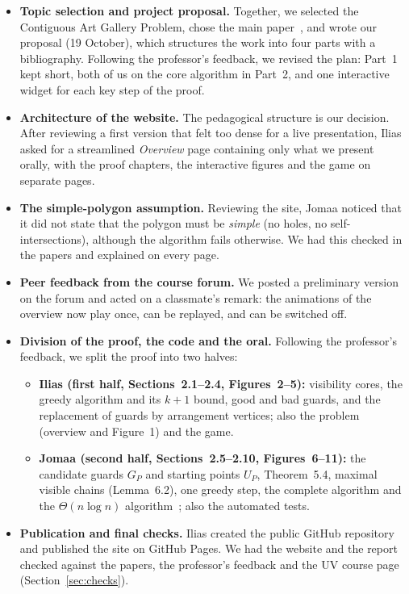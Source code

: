 \documentclass[11pt,a4paper]{article}
\begin{document}
\begin{tcolorbox}[breakable,colback=green!4,colframe=green!45!black,boxrule=0.5pt,arc=2mm,left=2.5mm,right=2.5mm,top=1.5mm,bottom=1.5mm]
\begin{itemize}[leftmargin=*]
\item \textbf{Topic selection and project proposal.} Together, we selected the Contiguous Art Gallery Problem, chose the main paper~\cite{deBerg2025}, and wrote
our proposal (19 October), which structures the work into four parts with a bibliography. Following the professor's feedback, we revised the plan: Part~1
kept short, both of us on the core algorithm in Part~2, and one interactive widget for each key step of the proof.
\item \textbf{Architecture of the website.} The pedagogical structure is our decision. After reviewing a first version that felt too dense for a live
presentation, Ilias asked for a streamlined \emph{Overview} page containing only what we present orally, with the proof chapters, the interactive figures and
the game on separate pages.
\item \textbf{The simple-polygon assumption.} Reviewing the site, Jomaa noticed that it did not state that the polygon must be \emph{simple} (no holes, no
self-intersections), although the algorithm fails otherwise. We had this checked in the papers and explained on every page.
\item \textbf{Peer feedback from the course forum.} We posted a preliminary version on the forum and acted on a classmate's remark: the animations of the
overview now play once, can be replayed, and can be switched off.
\item \textbf{Division of the proof, the code and the oral.} Following the professor's feedback, we split the proof into two halves:
  \begin{itemize}[leftmargin=1.2em]
  \item \textbf{Ilias (first half, Sections~2.1--2.4, Figures~2--5):} visibility cores, the greedy algorithm and its $k+1$ bound, good and bad guards, and
  the replacement of guards by arrangement vertices; also the problem (overview and Figure~1) and the game.
  \item \textbf{Jomaa (second half, Sections~2.5--2.10, Figures~6--11):} the candidate guards $G_P$ and starting points $U_P$, Theorem~5.4, maximal visible
  chains (Lemma~6.2), one greedy step, the complete algorithm and the $\Theta(n\log n)$ algorithm~\cite{deBerg2026}; also the automated tests.
  \end{itemize}
\item \textbf{Publication and final checks.} Ilias created the public GitHub repository and published the site on GitHub Pages. We had the website and the
report checked against the papers, the professor's feedback and the UV course page (Section~\ref{sec:checks}).
\end{itemize}
\end{tcolorbox}
\end{document}
